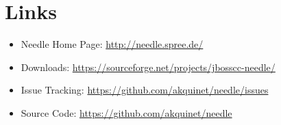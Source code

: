 \section{Links}

\begin{itemize}
 \item Needle Home Page:   	\url{http://needle.spree.de/}
	\item Downloads:        \url{https://sourceforge.net/projects/jbosscc-needle/}
	\item Issue Tracking:   \url{https://github.com/akquinet/needle/issues}
	\item Source Code:	\url{https://github.com/akquinet/needle}
\end{itemize}
